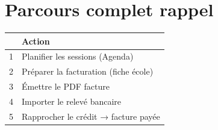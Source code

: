 \section{Parcours complet rappel}

\begin{center}
\small
\begin{tabular}{@{}cl@{}}
  \toprule
  & \textbf{Action} \\
  \midrule
  1 & Planifier les sessions (Agenda) \\
  2 & Préparer la facturation (fiche école) \\
  3 & Émettre le PDF facture \\
  4 & Importer le relevé bancaire \\
  5 & Rapprocher le crédit → facture payée \\
  \bottomrule
\end{tabular}
\end{center}
